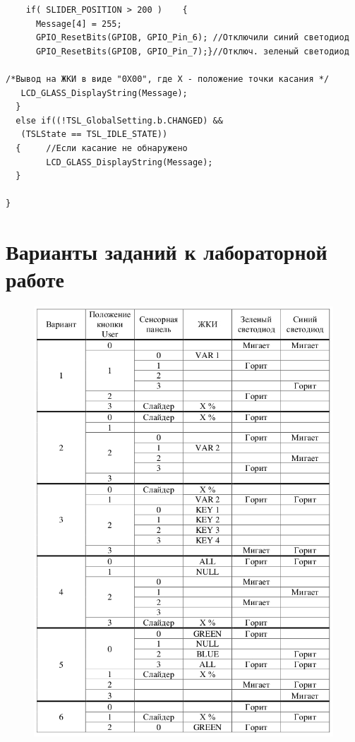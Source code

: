\begin{verbatim}
    if( SLIDER_POSITION > 200 )    {    
      Message[4] = 255;
      GPIO_ResetBits(GPIOB, GPIO_Pin_6); //Отключили синий светодиод
      GPIO_ResetBits(GPIOB, GPIO_Pin_7);}//Отключ. зеленый светодиод
      
/*Вывод на ЖКИ в виде "0Х00", где Х - положение точки касания */   
   LCD_GLASS_DisplayString(Message);
  } 
  else if((!TSL_GlobalSetting.b.CHANGED) &&
   (TSLState == TSL_IDLE_STATE))
  {     //Если касание не обнаружено
        LCD_GLASS_DisplayString(Message);
  }
   
}
\end{verbatim}


\section{Варианты заданий к лабораторной работе }
\label{Lab3Var}
\begin{figure}[H]
\begin{center}
\includegraphics[scale=0.7]{Image/91.jpg} 
\end{center}
\end{figure}


